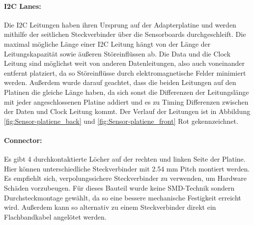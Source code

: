 \paragraph{I2C Lanes:}
Die I2C Leitungen haben ihren Ursprung auf der Adapterplatine und werden mithilfe der seitlichen Steckverbinder über die Sensorboards durchgeschleift.
Die maximal mögliche Länge einer I2C Leitung hängt von der Länge der Leitungskapazität sowie äußeren Störeinflüssen ab.
Die Data und die Clock Leitung sind möglichst weit von anderen Datenleitungen, also auch voneinander entfernt platziert, da so Störeinflüsse durch elektromagnetische Felder minimiert werden.
Außerdem wurde darauf geachtet, dass die beiden Leitungen auf den Platinen die gleiche Länge haben, da sich sonst die Differenzen der Leitungslänge mit jeder angeschlossenen Platine addiert und es zu Timing Differenzen zwischen der Daten und Clock Leitung kommt.
Der Verlauf der Leitungen ist in Abbildung \ref{fig:Sensor-platiene_back} und \ref{fig:Sensor-platiene_front} Rot gekennzeichnet.

\paragraph{Connector:} Es gibt 4 durchkontaktierte Löcher auf der rechten und linken Seite der Platine. Hier können unterschiedliche Steckverbinder mit 2.54 mm Pitch montiert werden.
	Es empfiehlt sich, verpolungssichere Steckverbinder zu verwenden, um Hardware Schäden vorzubeugen.
	Für dieses Bauteil wurde keine SMD-Technik sondern Durchsteckmontage gewählt, da so eine bessere mechanische Festigkeit erreicht wird.
	Außerdem kann so alternativ zu einem Steckverbinder direkt ein Flachbandkabel angelötet werden.

